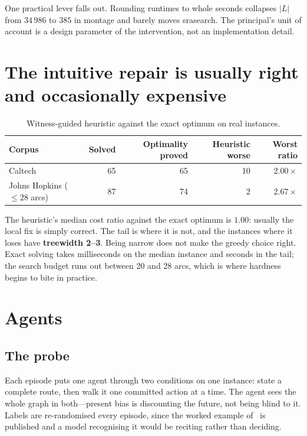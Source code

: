 \documentclass{article}
\begin{document}
One practical lever falls out. Rounding runtimes to whole seconds collapses $|L|$
from $34\,986$ to $385$ in montage and barely moves srasearch. The principal's unit
of account is a design parameter of the intervention, not an implementation detail.

\section{The intuitive repair is usually right and occasionally expensive}
\label{sec:c2}

\begin{table}[ht]
\centering
\begin{tabular}{lrrrr}
\toprule
Corpus & Solved & Optimality proved & Heuristic worse & Worst ratio \\
\midrule
Caltech                        & 65 & 65 & 10 & $\mathbf{2.00\times}$ \\
Johns Hopkins ($\leq 28$ arcs) & 87 & 74 &  2 & $\mathbf{2.67\times}$ \\
\bottomrule
\end{tabular}
\caption{Witness-guided heuristic against the exact optimum on real instances.}
\label{tab:solvers}
\end{table}

The heuristic's median cost ratio against the exact optimum is $1.00$: usually the
local fix is simply correct. The tail is where it is not, and the instances where it
loses have \textbf{treewidth 2--3}. Being narrow does not make the greedy choice
right. Exact solving takes milliseconds on the median instance and seconds in the
tail; the search budget runs out between 20 and 28 arcs, which is where hardness
begins to bite in practice.

\section{Agents}
\label{sec:agents}

\subsection{The probe}

Each episode puts one agent through two conditions on one instance: state a complete
route, then walk it one committed action at a time. The agent sees the whole graph in
both---present bias is discounting the future, not being blind to it. Labels are
re-randomised every episode, since the worked example of~\cite{belova2026} is
published and a model recognising it would be reciting rather than deciding.
\end{document}
